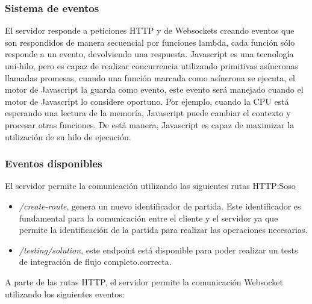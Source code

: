 \subsubsection{Sistema de eventos}
El servidor responde a peticiones HTTP y de Websockets creando eventos que son respondidos de manera secuencial por funciones lambda, cada función sólo responde a un evento, devolviendo una respuesta.
Javascript es una tecnología uni-hilo, pero es capaz de realizar concurrencia utilizando primitivas asíncronas llamadas promesas, cuando una función marcada como asíncrona se ejecuta, el motor de Javascript la guarda como evento, este evento será manejado cuando el motor de Javascript lo considere oportuno. Por ejemplo, cuando la CPU está esperando una lectura de la memoría, Javascript puede cambiar el contexto y procesar otras funciones. De está manera, Javascript es capaz de maximizar la utilización de su hilo de ejecución.

\subsubsection{Eventos disponibles}
El servidor permite la comunicación utilizando las siguientes rutas HTTP:Soso

\begin{itemize}
	\item \textit{/create-route}, genera un nuevo identificador de partida. Este identificador es fundamental para la comunicación entre el cliente y el servidor ya que permite la identificación de la partida para realizar las operaciones necesarias.
	\item \textit{/testing/solution}, este endpoint está disponible para poder realizar un tests de integración de flujo completo.correcta.
\end{itemize}

A parte de las rutas HTTP, el servidor permite la comunicación Websocket utilizando los siguientes eventos:

